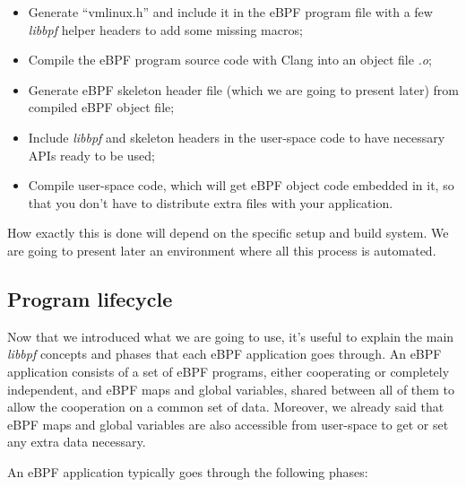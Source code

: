 \begin{itemize}
	\item Generate ``vmlinux.h'' and include it in the eBPF program file with a few 
		\textit{libbpf} helper headers to add some missing macros; 
	\item Compile the eBPF program source code with Clang into an object file
		\textit{.o};
	\item Generate eBPF skeleton header file (which we are going to present later)
		from compiled eBPF object file;
	\item Include \textit{libbpf} and skeleton headers in the user-space code to have
		necessary APIs ready to be used;
	\item Compile user-space code, which will get eBPF object code embedded in it, so
		that you don’t have to distribute extra files with your application.
\end{itemize}

How exactly this is done will depend on the specific setup and build system.
We are going to present later an environment where all this process is automated.

\subsection{Program lifecycle}

Now that we introduced what we are going to use, it’s useful to explain the main \textit{libbpf} concepts and phases that each eBPF application goes through. 
An eBPF application consists of a set of eBPF programs, either cooperating or completely independent, and eBPF maps and global variables, shared between all of them to allow the cooperation on a common set of data. 
Moreover, we already said that eBPF maps and global variables are also accessible from user-space to get or set any extra data necessary. 

An eBPF application typically goes through the following phases:


